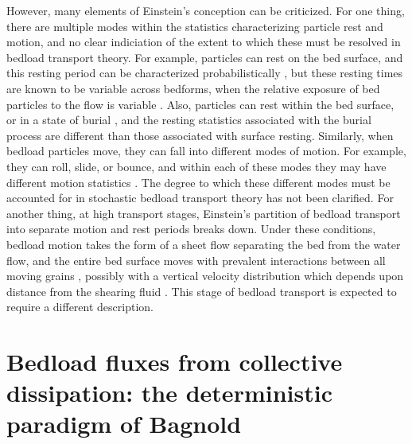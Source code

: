 \documentclass{article}
\begin{document}
However, many elements of Einstein's conception can be criticized. 
For one thing, there are multiple modes within the statistics characterizing particle rest and motion, and no clear indiciation of the extent to which these must be resolved in bedload transport theory. 
For example, particles can rest on the bed surface, and this resting period can be characterized probabilistically \citep{Einstein1950}, but these resting times are known to be variable across bedforms, when the relative exposure of bed particles to the flow is variable \citep{Crickmore1962, Sayre1967, Yang1971, Nakagawa1980}. 
Also, particles can rest within the bed surface, or in a state of burial \citep{Voepel2013, Martin2014, Olinde2015, Bradley2017}, and the resting statistics associated with the burial process are different than those associated with surface resting. 
Similarly, when bedload particles move, they can fall into different modes of motion. 
For example, they can roll, slide, or bounce, and within each of these modes they may have different motion statistics \citep{Frey2006, Frey2014}. 
The degree to which these different modes must be accounted for in stochastic bedload transport theory has not been clarified.  
For another thing, at high transport stages, Einstein's partition of bedload transport into separate motion and rest periods breaks down.
Under these conditions, bedload motion takes the form of a sheet flow separating the bed from the water flow, and the entire bed surface moves with prevalent interactions between all moving grains \cite{Jenkins1998, Clark2015}, possibly with a vertical velocity distribution which depends upon distance from the shearing fluid \citep{Bagnold1973, Frey2011, Mouilleron2009, Houssais2015, Ferdowski2016}.
This stage of bedload transport is expected to require a different description. 

\section{Bedload fluxes from collective dissipation: the deterministic paradigm of Bagnold} 

\end{document}
